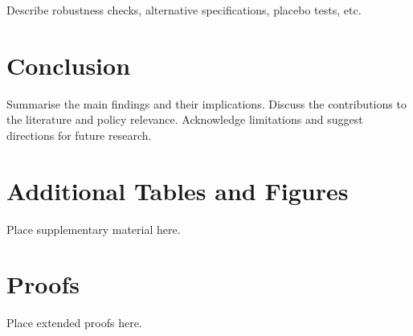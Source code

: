 \documentclass[12pt, a4paper]{article}
\theoremstyle{definition}
\theoremstyle{remark}
\begin{document}
Describe robustness checks, alternative specifications, placebo tests, etc.

\section{Conclusion}
\label{sec:conclusion}

Summarise the main findings and their implications. Discuss the contributions to
the literature and policy relevance. Acknowledge limitations and suggest directions
for future research.


\newpage
\singlespacing


\newpage
\appendix
\doublespacing

\section{Additional Tables and Figures}
\label{app:tables}

Place supplementary material here.

\section{Proofs}
\label{app:proofs}

Place extended proofs here.
\end{document}

